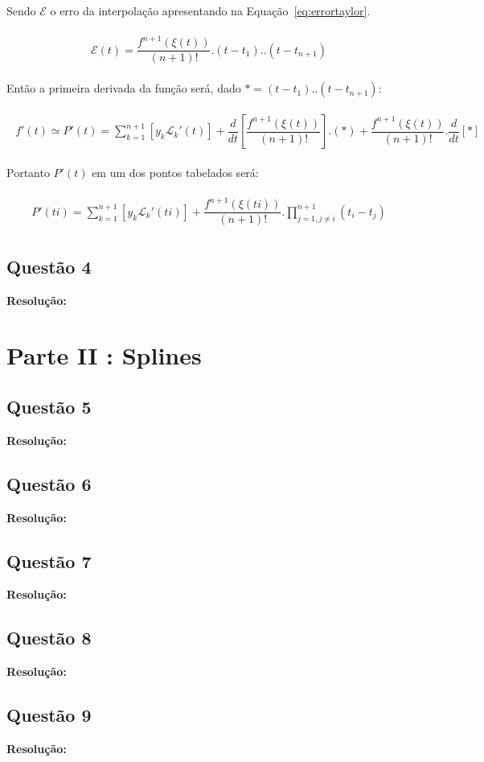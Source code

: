 \documentclass[12pt]{article}
\begin{document}
Sendo $\mathcal{E}$ o erro da interpolação apresentando na Equação~\ref{eq:errortaylor}.

\begin{eqnarray}
\begin{split}
\mathcal{E}(t) = \dfrac{f^{n+1}(\xi (t))}{(n+1)!}.(t-t_{1})..(t-t_{n+1})
\end{split}
\label{eq:errortaylor}
\end{eqnarray}

Então a primeira derivada da função será, dado $* = (t-t_{1})..(t-t_{n+1})$:

\begin{eqnarray}
\begin{split}
f'(t) \simeq P'(t) = \sum_{k=1}^{n+1} [y_{k} \mathcal{L}_{k}'(t)] + \dfrac{d}{dt}\left[\dfrac{f^{n+1}(\xi (t))}{(n+1)!}\right].(*) + \dfrac{f^{n+1}(\xi (t))}{(n+1)!}.\dfrac{d}{dt}[*]
\end{split}
\label{eq:1dlagrange}
\end{eqnarray}

Portanto $P'(t)$ em um dos pontos tabelados será:

\begin{eqnarray}
\begin{split}
P'(ti) = \sum_{k=1}^{n+1} [y_{k} \mathcal{L}_{k}'(ti)] + \dfrac{f^{n+1}(\xi (ti))}{(n+1)!}.\prod_{j=1, j \neq i}^{n+1} (t_{i} - t_{j})
\end{split}
\label{eq:1dtlagrange}
\end{eqnarray}

\subsection{Questão 4}
\label{subsec:p1q4}

\textbf{Resolução:}

\section{Parte II : Splines}
\label{sec:parte2}

\subsection{Questão 5}
\label{subsec:p2q5}

\textbf{Resolução:}

\subsection{Questão 6}
\label{subsec:p2q6}

\textbf{Resolução:}

\subsection{Questão 7}
\label{subsec:p2q7}

\textbf{Resolução:}

\subsection{Questão 8}
\label{subsec:p2q8}

\textbf{Resolução:}

\subsection{Questão 9}
\label{subsec:p2q9}

\textbf{Resolução:}
\end{document}
